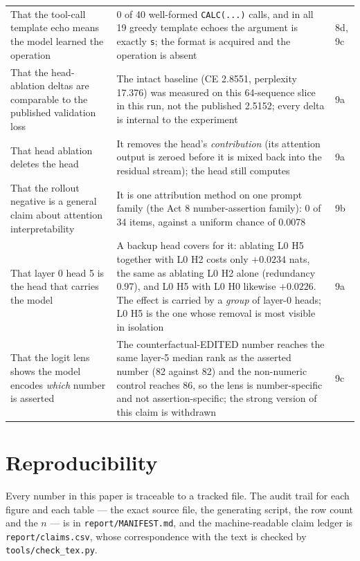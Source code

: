 \documentclass[11pt,a4paper]{article}
\begin{document}
\begin{longtable}{L{8.0cm}L{4.4cm}L{1.4cm}}
That the tool-call template echo means the model learned the operation & 0 of 40 well-formed \texttt{CALC(...)} calls, and in all 19 greedy template echoes the argument is exactly \texttt{s}; the format is acquired and the operation is absent & 8d, 9c \\
That the head-ablation deltas are comparable to the published validation loss & The intact baseline (CE 2.8551, perplexity 17.376) was measured on this 64-sequence slice in this run, not the published 2.5152; every delta is internal to the experiment & 9a \\
That head ablation deletes the head & It removes the head's \emph{contribution} (its attention output is zeroed before it is mixed back into the residual stream); the head still computes & 9a \\
That the rollout negative is a general claim about attention interpretability & It is one attribution method on one prompt family (the Act 8 number-assertion family): 0 of 34 items, against a uniform chance of 0.0078 & 9b \\
That layer 0 head 5 is the head that carries the model & A backup head covers for it: ablating L0 H5 together with L0 H2 costs only $+0.0234$ nats, the same as ablating L0 H2 alone (redundancy 0.97), and L0 H5 with L0 H0 likewise $+0.0226$. The effect is carried by a \emph{group} of layer-0 heads; L0 H5 is the one whose removal is most visible in isolation & 9a \\
That the logit lens shows the model encodes \emph{which} number is asserted & The counterfactual-EDITED number reaches the same layer-5 median rank as the asserted number (82 against 82) and the non-numeric control reaches 86, so the lens is number-specific and not assertion-specific; the strong version of this claim is withdrawn & 9c \\
\bottomrule
\end{longtable}

\section{Reproducibility}
\label{sec:repro}

Every number in this paper is traceable to a tracked file. The audit trail for
each figure and each table --- the exact source file, the generating script,
the row count and the $n$ --- is in \texttt{report/MANIFEST.md}, and the
machine-readable claim ledger is \texttt{report/claims.csv}, whose
correspondence with the text is checked by \texttt{tools/check\_tex.py}.
\end{document}
